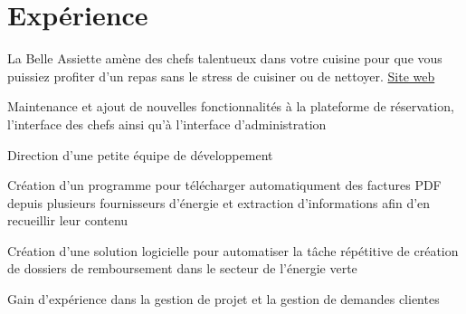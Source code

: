 \documentclass[
  french,
  a4paper
]{resume-openfont}
\begin{document}
\begin{minipage}[t]{0.66\textwidth}


\section{Expérience}
%
%
La Belle Assiette amène des chefs talentueux dans votre cuisine pour que vous puissiez profiter d'un repas sans le stress de cuisiner ou de nettoyer. \href{https://labelleassiette.fr}{Site web}
\vspace{1.5\topsep} %
\begin{tightemize}
\item Maintenance et ajout de nouvelles fonctionnalités à la plateforme de réservation, l'interface des chefs ainsi qu'à l'interface d'administration
\item Direction d'une petite équipe de développement
\end{tightemize}
\sectionsep

%
%
\vspace{1.5\topsep} %
\begin{tightemize}
\item Création d'un programme pour télécharger automatiqument des factures PDF depuis plusieurs fournisseurs d'énergie et extraction d'informations afin d'en recueillir leur contenu
\item Création d'une solution logicielle pour automatiser la tâche répétitive de création de dossiers de remboursement dans le secteur de l'énergie verte
\item Gain d'expérience dans la gestion de projet et la gestion de demandes clientes
\end{tightemize}
\sectionsep


\end{minipage}
\end{document}
